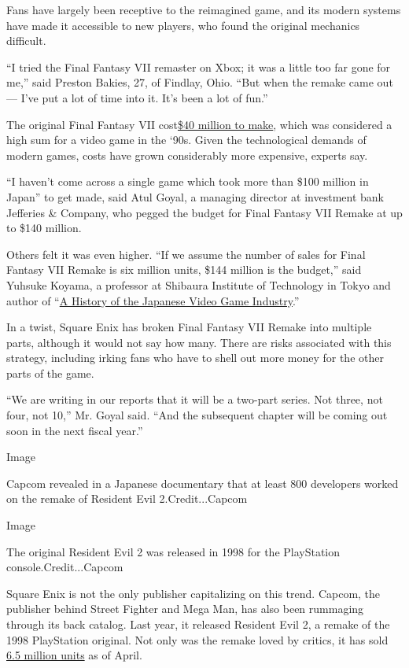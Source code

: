 Fans have largely been receptive to the reimagined game, and its modern
systems have made it accessible to new players, who found the original
mechanics difficult.

``I tried the Final Fantasy VII remaster on Xbox; it was a little too
far gone for me,'' said Preston Bakies, 27, of Findlay, Ohio. ``But when
the remake came out --- I've put a lot of time into it. It's been a lot
of fun.''

The original Final Fantasy VII
cost\href{https://www.polygon.com/a/final-fantasy-7}{\$40 million to
make}, which was considered a high sum for a video game in the `90s.
Given the technological demands of modern games, costs have grown
considerably more expensive, experts say.

``I haven't come across a single game which took more than \$100 million
in Japan'' to get made, said Atul Goyal, a managing director at
investment bank Jefferies \& Company, who pegged the budget for Final
Fantasy VII Remake at up to \$140 million.

Others felt it was even higher. ``If we assume the number of sales for
Final Fantasy VII Remake is six million units, \$144 million is the
budget,'' said Yuhsuke Koyama, a professor at Shibaura Institute of
Technology in Tokyo and author of
``\href{https://www.amazon.co.jp/dp/4409241079/ref=cm_sw_r_tw_dp_U_x_NWONEbES7SRZ9}{A
History of the Japanese Video Game Industry}.''

In a twist, Square Enix has broken Final Fantasy VII Remake into
multiple parts, although it would not say how many. There are risks
associated with this strategy, including irking fans who have to shell
out more money for the other parts of the game.

``We are writing in our reports that it will be a two-part series. Not
three, not four, not 10,'' Mr. Goyal said. ``And the subsequent chapter
will be coming out soon in the next fiscal year.''

Image

Capcom revealed in a Japanese documentary that at least 800 developers
worked on the remake of Resident Evil 2.Credit...Capcom

Image

The original Resident Evil 2 was released in 1998 for the PlayStation
console.Credit...Capcom

Square Enix is not the only publisher capitalizing on this trend.
Capcom, the publisher behind Street Fighter and Mega Man, has also been
rummaging through its back catalog. Last year, it released Resident Evil
2, a remake of the 1998 PlayStation original. Not only was the remake
loved by critics, it has sold
\href{http://www.capcom.co.jp/ir/english/news/html/e200413.html}{6.5
million units} as of April.

